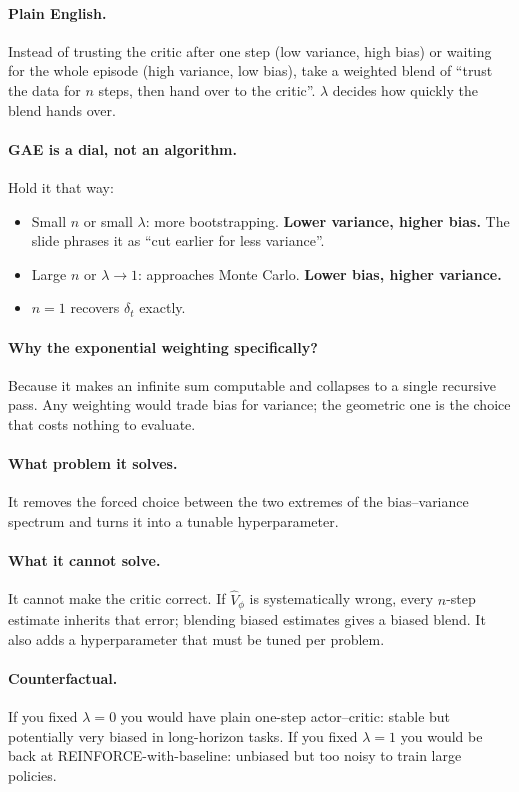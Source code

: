 \documentclass[11pt,a4paper]{article}
\begin{document}
\paragraph{Plain English.} Instead of trusting the critic after one step
(low variance, high bias) or waiting for the whole episode (high variance,
low bias), take a weighted blend of ``trust the data for $n$ steps, then
hand over to the critic''. $\lambda$ decides how quickly the blend hands over.

\paragraph{GAE is a dial, not an algorithm.} Hold it that way:
\begin{itemize}
\item Small $n$ or small $\lambda$: more bootstrapping. \textbf{Lower
variance, higher bias.} The slide phrases it as ``cut earlier for less
variance''.
\item Large $n$ or $\lambda\to1$: approaches Monte Carlo. \textbf{Lower bias,
higher variance.}
\item $n=1$ recovers $\delta_t$ exactly.
\end{itemize}

\paragraph{Why the exponential weighting specifically?} Because it makes an
infinite sum computable and collapses to a single recursive pass. Any
weighting would trade bias for variance; the geometric one is the choice that
costs nothing to evaluate.

\paragraph{What problem it solves.} It removes the forced choice between the
two extremes of the bias--variance spectrum and turns it into a tunable
hyperparameter.

\paragraph{What it cannot solve.} It cannot make the critic correct. If
$\hat V_\phi$ is systematically wrong, every $n$-step estimate inherits that
error; blending biased estimates gives a biased blend. It also adds a
hyperparameter that must be tuned per problem.

\paragraph{Counterfactual.} If you fixed $\lambda=0$ you would have plain
one-step actor--critic: stable but potentially very biased in
long-horizon tasks. If you fixed $\lambda=1$ you would be back at
REINFORCE-with-baseline: unbiased but too noisy to train large policies.
\end{document}
